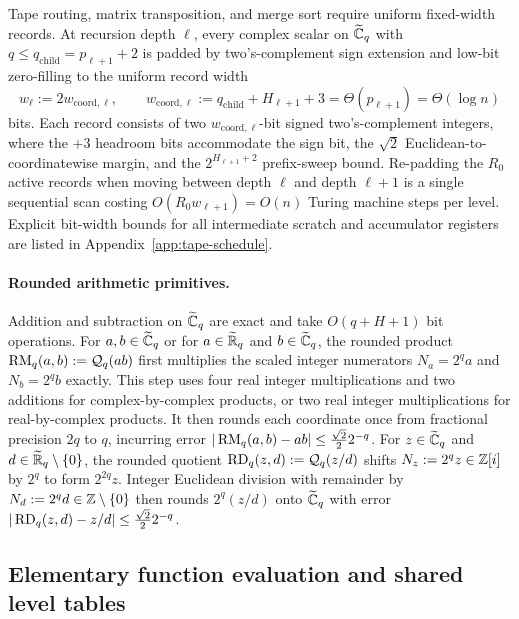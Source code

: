 Tape routing, matrix transposition, and merge sort require uniform fixed-width records. At recursion depth $\ell$, every complex scalar on $\widetilde{\mathbb{C}}_q$ with $q \le q_{\mathrm{child}} = p_{\ell+1} + 2$ is padded by two's-complement sign extension and low-bit zero-filling to the uniform record width
\begin{equation}\label{eq:record-width}
  w_\ell := 2 w_{\mathrm{coord},\ell}, \qquad w_{\mathrm{coord},\ell} := q_{\mathrm{child}} + H_{\ell+1} + 3 = \Theta(p_{\ell+1}) = \Theta(\log n)
\end{equation}
bits. Each record consists of two $w_{\mathrm{coord},\ell}$-bit signed two's-complement integers, where the $+3$ headroom bits accommodate the sign bit, the $\sqrt{2}$ Euclidean-to-coordinatewise margin, and the $2^{H_{\ell+1}+2}$ prefix-sweep bound. Re-padding the $R_0$ active records when moving between depth $\ell$ and depth $\ell+1$ is a single sequential scan costing $O(R_0 w_{\ell+1}) = O(n)$ Turing machine steps per level. Explicit bit-width bounds for all intermediate scratch and accumulator registers are listed in Appendix~\ref{app:tape-schedule}.

\paragraph{Rounded arithmetic primitives.}
Addition and subtraction on $\widetilde{\mathbb{C}}_q$ are exact and take $O(q + H + 1)$ bit operations. For $a, b \in \widetilde{\mathbb{C}}_q$ or for $a \in \widetilde{\mathbb{R}}_q$ and $b \in \widetilde{\mathbb{C}}_q$, the rounded product $\operatorname{RM}_q(a, b) := \mathcal{Q}_q(a b)$ first multiplies the scaled integer numerators $N_a = 2^q a$ and $N_b = 2^q b$ exactly. This step uses four real integer multiplications and two additions for complex-by-complex products, or two real integer multiplications for real-by-complex products. It then rounds each coordinate once from fractional precision $2q$ to $q$, incurring error $|\operatorname{RM}_q(a, b) - ab| \le \frac{\sqrt{2}}{2} 2^{-q}$. For $z \in \widetilde{\mathbb{C}}_q$ and $d \in \widetilde{\mathbb{R}}_q \setminus \{0\}$, the rounded quotient $\operatorname{RD}_q(z, d) := \mathcal{Q}_q(z / d)$ shifts $N_z := 2^q z \in \mathbb{Z}[i]$ by $2^q$ to form $2^{2q} z$. Integer Euclidean division with remainder by $N_d := 2^q d \in \mathbb{Z} \setminus \{0\}$ then rounds $2^q(z/d)$ onto $\widetilde{\mathbb{C}}_q$ with error $|\operatorname{RD}_q(z, d) - z/d| \le \frac{\sqrt{2}}{2} 2^{-q}$.

\subsection{Elementary function evaluation and shared level tables}\label{sec:tables}

